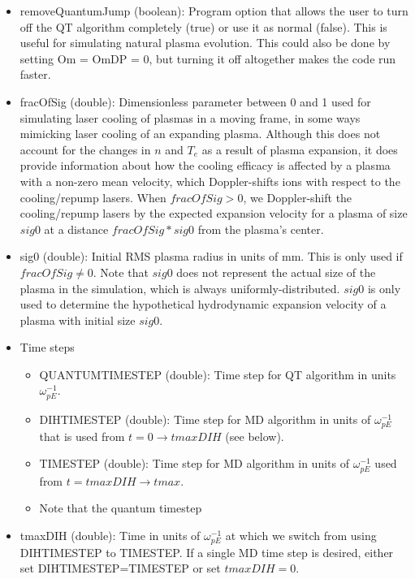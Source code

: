 \documentclass{article}
\begin{document}
\begin{itemize}
		\item removeQuantumJump (boolean): Program option that allows the user to turn off the QT algorithm completely (true) or use it as normal (false). This is useful for simulating natural plasma evolution. This could also be done by setting Om = OmDP = 0, but turning it off altogether makes the code run faster.
				
		\item fracOfSig (double): Dimensionless parameter between 0 and 1 used for simulating laser cooling of plasmas in a moving frame, in some ways mimicking laser cooling of an expanding plasma. Although this does not account for the changes in $n$ and $T_{e}$ as a result of plasma expansion, it does provide information about how the cooling efficacy is affected by a plasma with a non-zero mean velocity, which Doppler-shifts ions with respect to the cooling/repump lasers. When $fracOfSig>0$, we Doppler-shift the cooling/repump lasers by the expected expansion velocity for a plasma of size $sig0$ at a distance $fracOfSig*sig0$ from the plasma's center.
		
		\item sig0 (double): Initial RMS plasma radius in units of mm. This is only used if $fracOfSig\neq0$. Note that $sig0$ does not represent the actual size of the plasma in the simulation, which is always uniformly-distributed. $sig0$ is only used to determine the hypothetical hydrodynamic expansion velocity of a plasma with initial size $sig0$.
		
		
		
		\item Time steps
		\begin{itemize}
			\item QUANTUMTIMESTEP (double): Time step for QT algorithm in units $\omega_{pE}^{-1}$.
			
			\item DIHTIMESTEP (double): Time step for MD algorithm in units of $\omega_{pE}^{-1}$ that is used from $t=0 \rightarrow tmaxDIH$ (see below).
			
			\item TIMESTEP (double): Time step for MD algorithm in units of $\omega_{pE}^{-1}$ used from $t=tmaxDIH \rightarrow tmax$.
			
			\item Note that the quantum timestep 
		\end{itemize}
		
		\item tmaxDIH (double): Time in units of $\omega_{pE}^{-1}$ at which we switch from using DIHTIMESTEP to TIMESTEP. If a single MD time step is desired, either set DIHTIMESTEP=TIMESTEP or set $tmaxDIH=0$.
		
	\end{itemize}
	
\end{document}
